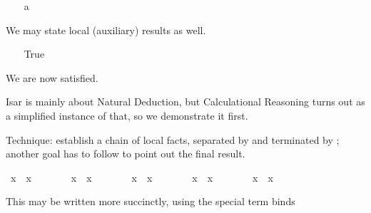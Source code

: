 \begin{isabellebody}
{}
\isanewline
\ \ \isamarkupfalse%
\ a\ \ %
\isamarkupfalse%
%
\begin{isamarkuptxt}%
We may state local (auxiliary) results as well.%
\end{isamarkuptxt}%
\ \ \isamarkuptrue%
\ True\ \isamarkupfalse%
\ \isamarkupfalse%
\isamarkupfalse%
%
\begin{isamarkuptxt}%
We are now satisfied.%
\end{isamarkuptxt}%
\isamarkuptrue%
\isamarkupfalse%
%
\isamarkuptrue%
%
\begin{isamarkuptext}%
Isar is mainly about Natural Deduction, but Calculational Reasoning
  turns out as a simplified instance of that, so we demonstrate it
  first.%
\end{isamarkuptext}%
\isamarkuptrue%
%
\isamarkuptrue%
%
\begin{isamarkuptext}%
Technique: establish a chain of local facts, separated by 
  and terminated by ; another goal has to follow to point
  out the final result.%
\end{isamarkuptext}%
\isamarkuptrue%
\ {\isachardoublequote}x{}\ {\isacharequal}\ x{}{\isachardoublequote}\isanewline
\isamarkupfalse%
\ {\isacharminus}\ \ %
\isanewline
\ \ \isamarkupfalse%
\ {\isachardoublequote}x{}\ {\isacharequal}\ x{}{\isachardoublequote}\ \isamarkupfalse%
\isanewline
\ \ \isamarkupfalse%
\isanewline
\ \ \isamarkupfalse%
\ {\isachardoublequote}x{}\ {\isacharequal}\ x{}{\isachardoublequote}\ \isamarkupfalse%
\isanewline
\ \ \isamarkupfalse%
\isanewline
\ \ \isamarkupfalse%
\ {\isachardoublequote}x{}\ {\isacharequal}\ x{}{\isachardoublequote}\ \isamarkupfalse%
\isanewline
\ \ \isamarkupfalse%
\isanewline
\ \ \isamarkupfalse%
\ {\isachardoublequote}x{}\ {\isacharequal}\ x{}{\isachardoublequote}\ \isamarkupfalse%
\isacommand{{\isachardot}}\isanewline
\isamarkupfalse%
\isamarkupfalse%
%
\begin{isamarkuptext}%
This may be written more succinctly, using the special term binds

\end{isamarkuptext}
\end{isabellebody}
